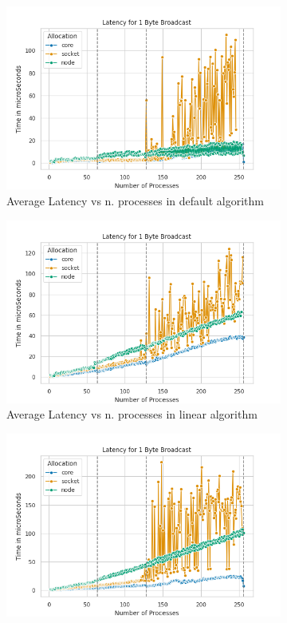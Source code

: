 \documentclass{article}
\begin{document}
	\begin{figure}[h]
		\centering
		\begin{subfigure}{0.45\textwidth}
		\centering
		\includegraphics[width=0.7\linewidth]{../exercise1/plots/bcast_default_1byte}
		\caption{Average Latency vs n. processes in default algorithm}
		\label{fig:bcastdefault1byte}
		\end{subfigure}
		\begin{subfigure}{0.45\textwidth}
			\centering
			\includegraphics[width=0.7\linewidth]{../exercise1/plots/bcast_linear_1byte}
			\caption{Average Latency vs n. processes in linear algorithm}
			\label{fig:bcastlinear1byte}
		\end{subfigure}
		\begin{subfigure}{0.45\textwidth}
			\centering
			\includegraphics[width=0.7\linewidth]{../exercise1/plots/bcast_chain_1byte}

\end{subfigure}
\end{figure}
\end{document}
